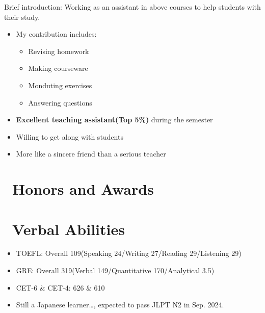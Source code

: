 \documentclass{resume}
\begin{document}
Brief introduction: Working as an assistant in above courses to help students with their study.
\begin{itemize}
  \item My contribution includes: 
\begin{itemize}
  \item  Revising homework 
  \item  Making courseware
  \item  Monduting exercises 
  \item  Answering questions
\end{itemize} 
  \item \textbf{Excellent teaching assistant(Top 5\%)} during the semester
  \item Willing to get along with students
  \item More like a sincere friend than a serious teacher
\end{itemize}



\section{\faHeartO\ Honors and Awards}

\section{\faInfo\ Verbal Abilities}
\begin{itemize}[parsep=0.5ex]
  \item TOEFL: Overall 109(Speaking 24/Writing 27/Reading 29/Listening 29)
  \item GRE: Overall 319(Verbal 149/Quantitative 170/Analytical 3.5)
  \item CET-6 \& CET-4: 626 \& 610
  \item Still a Japanese learner\dots, expected to pass JLPT N2 in Sep. 2024.
\end{itemize}

%
%
\end{document}
